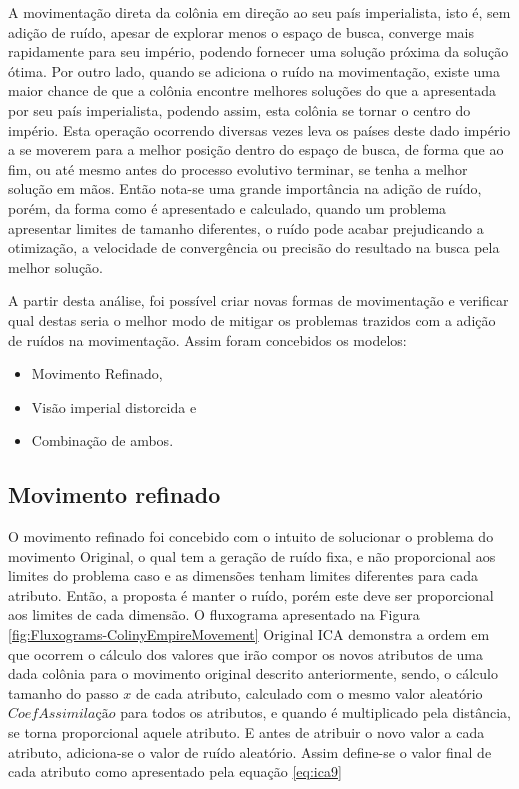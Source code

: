 A movimentação direta da colônia em direção ao seu país imperialista, isto é, sem adição de ruído, apesar de explorar menos o espaço de busca, converge mais rapidamente para seu império, podendo fornecer uma solução próxima da solução ótima. Por outro lado, quando se adiciona o ruído na movimentação, existe uma maior chance de que a colônia encontre melhores soluções do que a apresentada por seu país imperialista, podendo assim, esta colônia se tornar o centro do império. Esta operação ocorrendo diversas vezes leva os países deste dado império a se moverem para a melhor posição dentro do espaço de busca, de forma que ao fim, ou até mesmo antes do processo evolutivo terminar, se tenha a melhor solução em mãos. Então nota-se uma grande importância na adição de ruído, porém, da forma como é apresentado e calculado, quando um problema apresentar limites de tamanho diferentes, o ruído pode acabar prejudicando a otimização, a velocidade de convergência ou precisão do resultado na busca pela melhor solução.

A partir desta análise, foi possível criar novas formas de movimentação e verificar qual destas seria o melhor modo de mitigar os problemas trazidos com a adição de ruídos na movimentação. Assim foram concebidos os modelos:
\begin{itemize}
\item Movimento Refinado,
\item Visão imperial distorcida e 
\item Combinação de ambos.
\end{itemize}







\subsection{Movimento refinado}

O movimento refinado foi concebido com o intuito de solucionar o problema do movimento Original, o qual tem a geração de ruído fixa, e não proporcional aos limites do problema caso e as dimensões tenham limites diferentes para cada atributo. Então, a proposta é manter o ruído, porém este deve ser proporcional aos limites de cada dimensão. O fluxograma apresentado na Figura \ref{fig:Fluxograms-ColinyEmpireMovement} Original ICA demonstra a ordem em que ocorrem o cálculo dos valores que irão compor os novos atributos de uma dada colônia para o movimento original descrito anteriormente, sendo, o cálculo tamanho do passo \(x\) de cada atributo, calculado com o mesmo valor aleatório \(CoefAssimilação\) para todos os atributos, e quando é multiplicado pela distância, se torna proporcional aquele atributo. E antes de atribuir o novo valor a cada atributo, adiciona-se o valor de ruído aleatório. Assim define-se o valor final de cada atributo como apresentado pela equação \ref{eq:ica9}
	
